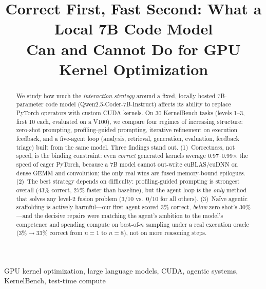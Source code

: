 \documentclass[conference]{IEEEtran}
\begin{document}
\title{Correct First, Fast Second: What a Local 7B Code Model\\
Can and Cannot Do for GPU Kernel Optimization}

\author{%
%
}

\maketitle

\begin{abstract}
We study how much the \emph{interaction strategy} around a fixed, locally hosted
7B-parameter code model (Qwen2.5-Coder-7B-Instruct) affects its ability to replace
PyTorch operators with custom CUDA kernels. On 30 KernelBench tasks (levels 1--3,
first 10 each, evaluated on a V100), we compare four regimes of increasing
structure: zero-shot prompting, profiling-guided prompting, iterative refinement on
execution feedback, and a five-agent loop (analysis, retrieval, generation,
evaluation, feedback triage) built from the same model. Three findings stand out.
(1)~Correctness, not speed, is the binding constraint: even \emph{correct} generated
kernels average 0.97--0.99$\times$ the speed of eager PyTorch, because a 7B model
cannot out-write cuBLAS/cuDNN on dense GEMM and convolution; the only real wins are
fused memory-bound epilogues. (2)~The best strategy depends on difficulty:
profiling-guided prompting is strongest overall (43\% correct, 27\% faster than
baseline), but the agent loop is the \emph{only} method that solves any level-2
fusion problem (3/10 vs.\ 0/10 for all others). (3)~Na\"ive agentic scaffolding is
actively harmful---our first agent scored 3\% correct, \emph{below} zero-shot's
30\%---and the decisive repairs were matching the agent's ambition to the model's
competence and spending compute on best-of-$n$ sampling under a real execution
oracle (3\%$\to$33\% correct from $n{=}1$ to $n{=}8$), not on more reasoning steps.
\end{abstract}

\begin{IEEEkeywords}
GPU kernel optimization, large language models, CUDA, agentic systems, KernelBench, test-time compute
\end{IEEEkeywords}
\end{document}
